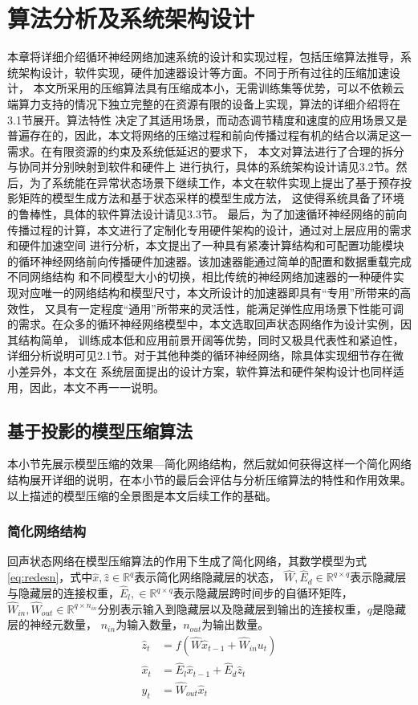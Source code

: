 \chapter{算法分析及系统架构设计}
本章将详细介绍循环神经网络加速系统的设计和实现过程，包括压缩算法推导，系统架构设计，软件实现，硬件加速器设计等方面。不同于所有过往的压缩加速设计，
本文所采用的压缩算法具有压缩成本小，无需训练集等优势，可以不依赖云端算力支持的情况下独立完整的在资源有限的设备上实现，算法的详细介绍将在3.1节展开。算法特性
决定了其适用场景，而动态调节精度和速度的应用场景又是普遍存在的，因此，本文将网络的压缩过程和前向传播过程有机的结合以满足这一需求。在有限资源的约束及系统低延迟的要求下，
本文对算法进行了合理的拆分与协同并分别映射到软件和硬件上
进行执行，具体的系统架构设计请见3.2节。然后，为了系统能在异常状态场景下继续工作，本文在软件实现上提出了基于预存投影矩阵的模型生成方法和基于状态采样的模型生成方法，
这使得系统具备了环境的鲁棒性，具体的软件算法设计请见3.3节。
最后，为了加速循环神经网络的前向传播过程的计算，本文进行了定制化专用硬件架构的设计，通过对上层应用的需求和硬件加速空间
进行分析，本文提出了一种具有紧凑计算结构和可配置功能模块的循环神经网络前向传播硬件加速器。该加速器能通过简单的配置和数据重载完成不同网络结构
和不同模型大小的切换，相比传统的神经网络加速器的一种硬件实现对应唯一的网络结构和模型尺寸，本文所设计的加速器即具有“专用”所带来的高效性，
又具有一定程度“通用”所带来的灵活性，能满足弹性应用场景下性能可调的需求。在众多的循环神经网络模型中，本文选取回声状态网络作为设计实例，因其结构简单，
训练成本低和应用前景开阔等优势，同时又极具代表性和紧迫性，详细分析说明可见2.1节。对于其他种类的循环神经网络，除具体实现细节存在微小差异外，本文在
系统层面提出的设计方案，软件算法和硬件架构设计也同样适用，因此，本文不再一一说明。
\section{基于投影的模型压缩算法}
本小节先展示模型压缩的效果---简化网络结构，然后就如何获得这样一个简化网络结构展开详细的说明，在本小节的最后会评估与分析压缩算法的特性和作用效果。
以上描述的模型压缩的全景图是本文后续工作的基础。
\subsection{简化网络结构}
回声状态网络在模型压缩算法的作用下生成了简化网络，其数学模型为式\ref{eq:redesn}，式中\(\widehat{x},\widehat{z} \in \mathbb{R}^q\)表示简化网络隐藏层的状态，
\(\widehat{W}, \widehat{E}_d \in \mathbb{R}^{q \times q}\)表示隐藏层与隐藏层的连接权重，\(\widehat{E}_l,\in \mathbb{R}^{q \times q}\)表示隐藏层跨时间步的自循环矩阵，
\(\widehat{W}_{in},\widehat{W}_{out}\in \mathbb{R}^{q \times n_{in}}\)分别表示输入到隐藏层以及隐藏层到输出的连接权重，\(q\)是隐藏层的神经元数量，
\(n_{in}\)为输入数量，\(n_{out}\)为输出数量。
\begin{equation}\label{eq:redesn}
	\begin{split}
		\widehat{z}_t &= f(\widehat{W}  \widehat{x}_{t-1} + \widehat{W}_{in}  u_{t})				\\	
		\widehat{x}_t &= \widehat{E}_l  \widehat{x}_{t-1} + \widehat{E}_d  \widehat{z}_{t} 		\\
		y_{t} 			&= \widehat{W}_{out}  \widehat{x}_{t}	
	\end{split}
\end{equation}

